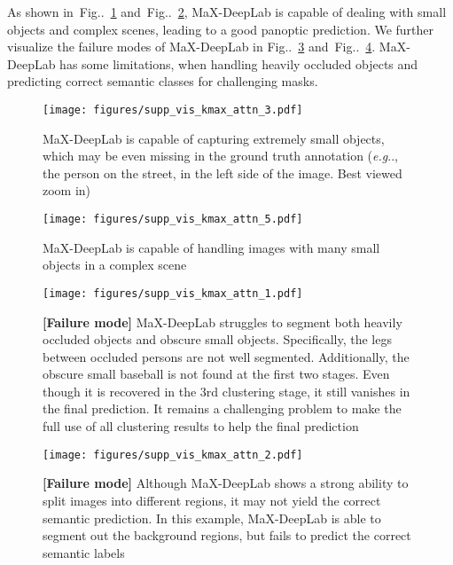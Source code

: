 \documentclass[runningheads]{llncs}
\makeatletter
\DeclareRobustCommand\onedot{\futurelet\@let@token\@onedot}
\def\@onedot{\ifx\@let@token.\else.\null\fi\xspace}
\def\eg{\emph{e.g}\onedot} \def\Eg{\emph{E.g}\onedot}
\newcommand{\figref}[1]{Fig\onedot~\ref{#1}}
\makeatother
\begin{document}
As shown in~\figref{fig:supp_vis_kmax_3} and~\figref{fig:supp_vis_kmax_5}, MaX-DeepLab is capable of dealing with small objects and complex scenes, leading to a good panoptic prediction.
We further visualize the failure modes of MaX-DeepLab in \figref{fig:supp_vis_kmax_1} and~\figref{fig:supp_vis_kmax_2}.
MaX-DeepLab has some limitations, when handling heavily occluded objects and predicting correct semantic classes for challenging masks.


\begin{figure}[b]
    \centering
    \texttt{[image: figures/supp\_vis\_kmax\_attn\_3.pdf]}
    \caption{
    MaX-DeepLab is capable of capturing extremely small objects, which may be even missing in the ground truth annotation (\eg, the person on the street, in the left side of the image. Best viewed zoom in)}
    \label{fig:supp_vis_kmax_3}
\end{figure}

\begin{figure}[t]
    \centering
    \texttt{[image: figures/supp\_vis\_kmax\_attn\_5.pdf]}
    \caption{
    MaX-DeepLab is capable of handling images with many small objects in a complex scene
    }
    \label{fig:supp_vis_kmax_5}
\end{figure}

\begin{figure}[t]
    \centering
    \texttt{[image: figures/supp\_vis\_kmax\_attn\_1.pdf]}
    \caption{
    \textbf{[Failure mode]} MaX-DeepLab struggles to segment both heavily occluded objects and obscure small objects.
    Specifically, the legs between occluded persons are not well segmented. Additionally, the obscure small baseball is not found at the first two stages. Even though it is recovered in the 3rd clustering stage, it still vanishes in the final prediction. It remains a challenging problem to make the full use of all clustering results to help the final prediction}
    \label{fig:supp_vis_kmax_1}
\end{figure}

\begin{figure}[t]
    \centering
    \texttt{[image: figures/supp\_vis\_kmax\_attn\_2.pdf]}
    \caption{
    \textbf{[Failure mode]} Although MaX-DeepLab shows a strong ability to split images into different regions, it may not yield the correct semantic prediction.
    In this example, MaX-DeepLab is able to segment out the background regions, but fails to predict the correct semantic labels
    }
    \label{fig:supp_vis_kmax_2}
\end{figure} 
\end{document}
